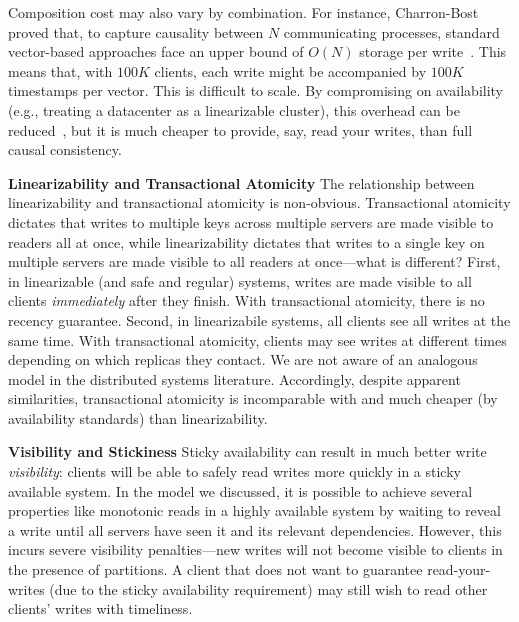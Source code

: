 Composition cost may also vary by combination. For instance, Charron-Bost
 proved that, to capture causality between $N$ communicating
processes, standard vector-based approaches face an upper bound of
$O(N)$ storage per write~\cite{charron-bost}. This means that, with
$100K$ clients, each write might be accompanied by $100K$ timestamps
per vector. This is difficult to scale. By compromising on
availability (e.g., treating a datacenter as a linearizable cluster),
this overhead can be reduced~\cite{eiger}, but it is much
cheaper to provide, say, read your writes, than full causal
consistency.

\vspace{.5em}\noindent\textbf{Linearizability and Transactional
  Atomicity} The relationship between linearizability and
transactional atomicity is non-obvious. Transactional atomicity
dictates that writes to multiple keys across multiple servers are made
visible to readers all at once, while linearizability dictates that
writes to a single key on multiple servers are made visible to all
readers at once---what is different? First, in linearizable (and safe
and regular) systems, writes are made visible to all clients
\textit{immediately} after they finish. With transactional atomicity,
there is no recency guarantee. Second, in linearizabile systems, all
clients see all writes at the same time. With transactional atomicity,
clients may see writes at different times depending on which replicas
they contact. We are not aware of an analogous model in the
distributed systems literature. Accordingly, despite apparent
similarities, transactional atomicity is incomparable with and much
cheaper (by availability standards) than linearizability.

\vspace{.5em}\noindent\textbf{Visibility and Stickiness} Sticky
availability can result in much better write \textit{visibility}:
clients will be able to safely read writes more quickly in a sticky
available system. In the model we discussed, it is possible to achieve
several properties like monotonic reads in a highly available system
by waiting to reveal a write until all servers have seen it and its
relevant dependencies. However, this incurs severe visibility
penalties---new writes will not become visible to clients in the
presence of partitions. A client that does not want to guarantee
read-your-writes (due to the sticky availability requirement) may
still wish to read other clients' writes with timeliness.
